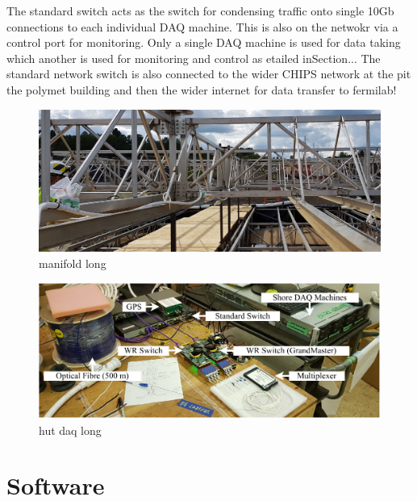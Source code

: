 The standard switch acts as the switch for condensing traffic onto single 10Gb connections to each
individual DAQ machine. This is also on the netwokr via a control port for monitoring. Only a
single DAQ machine is used for data taking which another is used for monitoring and control as
etailed inSection... The standard network switch is also connected to the wider CHIPS network at
the pit the polymet building and then the wider internet for data transfer to fermilab!

\begin{figure} %
    \includegraphics[width=\textwidth]{diagrams/5-daq/manifold.jpg}
    \caption[manifold short]
    {manifold long}
    \label{fig:manifold}
\end{figure}

\begin{figure} %
    \includegraphics[width=\textwidth]{diagrams/5-daq/hut_daq.pdf}
    \caption[hut daq short]
    {hut daq long}
    \label{fig:hut_daq}
\end{figure}

\section{Software} %
\label{sec:daq_soft} %

